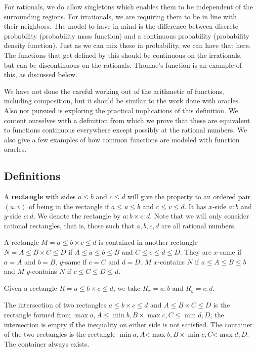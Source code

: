 \documentclass[12pt]{article}
\theoremstyle{remark}
\newcommand{\lt}{\mathord{<}}
\begin{document}
For rationals, we do allow singletons which enables them to be independent of the surrounding regions. For irrationals, we are requiring them to be in line with their neighbors. The model to have in mind is the difference between discrete probability (probability mass function) and a continuous probability (probability density function). Just as we can mix these in probability, we can have that here. The functions that get defined by this should be continuous on the irrationals, but can be discontinuous on the rationals. Thomae's function is an example of this, as discussed below. 

We have not done the careful working out of the arithmetic of functions, including composition, but it should be similar to the work done with oracles. Also not pursued is exploring the practical implications of this definition. We content ourselves with a definition from which we prove that these are equivalent to functions continuous everywhere except possibly at the rational numbers. We also give a few examples of how common functions are modeled with function oracles. 

\subsection{Definitions}

A \textbf{rectangle} with sides $a \leq b$ and $c \leq d$ will give the property to an ordered pair $(u, v)$ of being in the rectangle if $a \leq u \leq b$ and $c \leq v \leq d$. It has $x$-side $a:b$ and $y$-side $c:d$. We denote the rectangle by $a:b \times c:d$. Note that we will only consider rational rectangles, that is, those such that $a, b, c, d$ are all rational numbers. 

A rectangle $M = a \leq b \times c \leq d$ is contained in another rectangle $N = A \leq B \times C \leq D$ if $A \leq a \leq b \leq B$ and $C \leq c \leq d \leq D$. They are $x$-same if $a=A$ and $b=B$, $y$-same if $c=C$ and $d=D$. $M$ $x$-contains $N$ if $a \leq A \leq B \leq b$ and $M$ $y$-contains $N$ if $c \leq C \leq D \leq d$.

Given a rectangle $R = a \leq b \times c \leq d$, we take $R_x = a:b$ and $R_y = c:d$. 

The intersection of two rectangles $a \leq b \times c \leq d$ and $A \leq B \times C \leq D$ is the rectangle formed from $\max{a,A} \leq \min{b,B} \times \max{c, C} \leq \min{d, D}$; the intersection is empty if the inequality on either side is not satisfied. The container of the two rectangles is the rectangle $\min{a,A} \lt \max{b,B} \times \min{c, C} \lt \max{d, D}$. The container always exists. 
\end{document}
